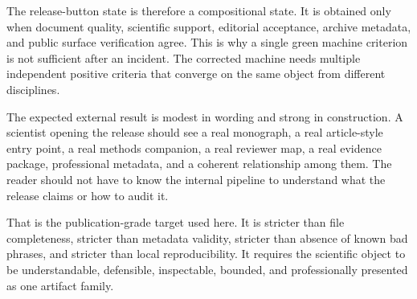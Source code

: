The release-button state is therefore a compositional state. It is obtained only when document quality, scientific support, editorial acceptance, archive metadata, and public surface verification agree. This is why a single green machine criterion is not sufficient after an incident. The corrected machine needs multiple independent positive criteria that converge on the same object from different disciplines.


The expected external result is modest in wording and strong in construction. A scientist opening the release should see a real monograph, a real article-style entry point, a real methods companion, a real reviewer map, a real evidence package, professional metadata, and a coherent relationship among them. The reader should not have to know the internal pipeline to understand what the release claims or how to audit it.


That is the publication-grade target used here. It is stricter than file completeness, stricter than metadata validity, stricter than absence of known bad phrases, and stricter than local reproducibility. It requires the scientific object to be understandable, defensible, inspectable, bounded, and professionally presented as one artifact family.

